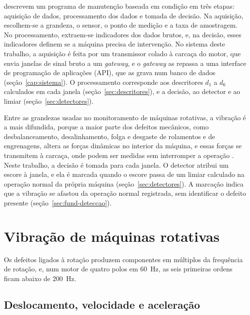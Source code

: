  descrevem um programa de manutenção baseada em condição em três etapas: aquisição de dados, processamento dos dados e tomada de decisão. Na aquisição, escolhem-se a grandeza, o sensor, o ponto de medição e a taxa de amostragem. No processamento, extraem-se indicadores dos dados brutos, e, na decisão, esses indicadores definem se a máquina precisa de intervenção. No sistema deste trabalho, a aquisição é feita por um transmissor colado à carcaça do motor, que envia janelas de sinal bruto a um \textit{gateway}, e o \textit{gateway} as repassa a uma interface de programação de aplicações (API), que as grava num banco de dados (seção~\ref{cap:sistema}). O processamento corresponde aos descritores $d_1$ a $d_6$ calculados em cada janela (seção~\ref{sec:descritores}), e a decisão, ao detector e ao limiar (seção~\ref{sec:detectores}).

Entre as grandezas usadas no monitoramento de máquinas rotativas, a vibração é a mais difundida, porque a maior parte dos defeitos mecânicos, como desbalanceamento, desalinhamento, folga e desgaste de rolamentos e de engrenagens, altera as forças dinâmicas no interior da máquina, e essas forças se transmitem à carcaça, onde podem ser medidas sem interromper a operação \cite{randall2011livro}. Neste trabalho, a decisão é tomada para cada janela. O detector atribui um escore à janela, e ela é marcada quando o escore passa de um limiar calculado na operação normal da própria máquina (seção~\ref{sec:detectores}). A marcação indica que a vibração se afastou da operação normal registrada, sem identificar o defeito presente (seção~\ref{sec:fund-deteccao}).

\section{Vibração de máquinas rotativas}\label{sec:fund-vibracao}

Os defeitos ligados à rotação produzem componentes em múltiplos da frequência de rotação, e, num motor de quatro polos em \SI{60}{\hertz}, as seis primeiras ordens ficam abaixo de \SI{200}{\hertz}.

\subsection{Deslocamento, velocidade e aceleração}

